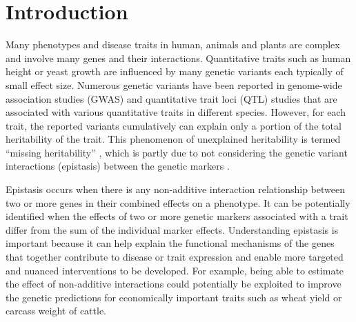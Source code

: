 \documentclass[unnumsec,webpdf,contemporary,large,namedate,figuresright,figuresleft]{oup-authoring-template}%
\theoremstyle{thmstyleone}%
\theoremstyle{thmstyletwo}%
\theoremstyle{thmstylethree}%
\begin{document}

\maketitle

\linenumbers
\section{Introduction}
Many phenotypes and disease traits in human, animals and plants are complex and involve many genes and their
interactions.  Quantitative traits such as human height or yeast growth are influenced by many genetic variants each
typically of small effect size.  Numerous genetic variants have been reported in genome-wide association studies (GWAS)
and quantitative trait loci (QTL) studies that are associated with various quantitative traits in different
species. However, for each trait, the reported variants cumulatively can explain only a portion of the total
heritability of the trait.  This phenomenon of unexplained heritability is termed ``missing heritability''
\cite[]{Maher2008}, which is partly due to not considering the genetic variant interactions (epistasis) between the
genetic markers \cite[]{Zuk.et.al.2012}.

Epistasis occurs when there is any non-additive interaction relationship between two or more genes in their combined
effects on a phenotype. It can be potentially identified when the effects of two or more genetic markers associated with
a trait differ from the sum of the individual marker effects. Understanding epistasis is important because it can help
explain the functional mechanisms of the genes that together contribute to disease or trait expression and enable more
targeted and nuanced interventions to be developed. For example, being able to estimate the effect of non-additive
interactions could potentially be exploited to improve the genetic predictions \cite[]{Ansarifar.et.al.2020} for
economically important traits such as wheat yield or carcass weight of cattle.
\end{document}

